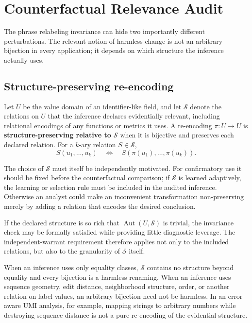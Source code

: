 \documentclass[11pt]{article}
\begin{document}
\section{Counterfactual Relevance Audit}

The phrase relabeling invariance can hide two importantly different perturbations. The relevant notion of harmless change is not an arbitrary bijection in every application; it depends on which structure the inference actually uses.

\subsection{Structure-preserving re-encoding}

Let \(U\) be the value domain of an identifier-like field, and let \(\mathcal S\) denote the relations on \(U\) that the inference declares evidentially relevant, including relational encodings of any functions or metrics it uses. A re-encoding \(\pi:U\to U\) is \textbf{structure-preserving relative to \(\mathcal S\)} when it is bijective and preserves each declared relation. For a \(k\)-ary relation \(S\in\mathcal S\),
\[
S(u_1,\ldots,u_k)
\quad\Longleftrightarrow\quad
S(\pi(u_1),\ldots,\pi(u_k)).
\]

The choice of \(\mathcal S\) must itself be independently motivated. For confirmatory use it should be fixed before the counterfactual comparison; if \(\mathcal S\) is learned adaptively, the learning or selection rule must be included in the audited inference. Otherwise an analyst could make an inconvenient transformation non-preserving merely by adding a relation that encodes the desired conclusion.

If the declared structure is so rich that \(\operatorname{Aut}(U,\mathcal S)\) is trivial, the invariance check may be formally satisfied while providing little diagnostic leverage. The independent-warrant requirement therefore applies not only to the included relations, but also to the granularity of \(\mathcal S\) itself.

When an inference uses only equality classes, \(\mathcal S\) contains no structure beyond equality and every bijection is a harmless renaming. When an inference uses sequence geometry, edit distance, neighborhood structure, order, or another relation on label values, an arbitrary bijection need not be harmless. In an error-aware UMI analysis, for example, mapping strings to arbitrary numbers while destroying sequence distance is not a pure re-encoding of the evidential structure.
\end{document}
